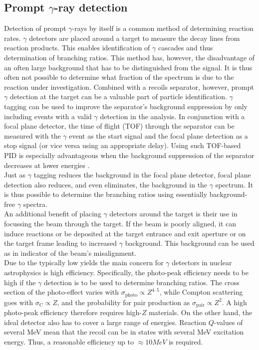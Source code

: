 \subsection{Prompt $\gamma$-ray detection}

Detection of prompt $\gamma$-rays by itself is a common method of determining reaction rates. $\gamma$ detectors are placed around a target to measure the decay lines from reaction products. This enables identification of $\gamma$ cascades and thus determination of branching ratios. This method has, however, the disadvantage of an often large background that has to be distinguished from the signal. It is thus often not possible to determine what fraction of the spectrum is due to the reaction under investigation. Combined with a recoils separator, however, prompt $\gamma$ detection at the target can be a valuable part of particle identification. $\gamma$ tagging can be used to improve the separator's background suppression by only including events with a valid $\gamma$ detection in the analysis. In conjunction with a focal plane detector, the time of flight (TOF) through the separator can be measured with the $\gamma$ event as the start signal and the focal plane detection as a stop signal (or vice versa using an appropriate delay). Using such TOF-based PID is especially advantageous when the background suppression of the separator decreases at lower energies \cite{hutc08}. \\
Just as $\gamma$ tagging reduces the background in the focal plane detector, focal plane detection also reduces, and even eliminates, the background in the $\gamma$ spectrum. It is thus possible to determine the branching ratios using essentially background-free $\gamma$ spectra.\\
An additional benefit of placing $\gamma$ detectors around the target is their use in focussing the beam through the target. If the beam is poorly aligned, it can induce reactions or be deposited at the target entrance and exit aperture or on the target frame leading to increased $\gamma$ background. This background can be used as in indicator of the beam's misalignment.\\  
Due to the typically low yields the main concern for $\gamma$ detectors in nuclear astrophysics is high efficiency. Specifically, the photo-peak efficiency needs to be high if the $\gamma$ detection is to be used to determine branching ratios. The cross section of the photo-effect varies with $\sigma_\mathrm{photo} \propto Z^{4\textrm{--}5}$, while Compton scattering goes with $\sigma_\mathrm{C} \propto Z$, and the probability for pair production as $\sigma_\mathrm{pair} \propto Z^2$. A high photo-peak efficiency therefore requires high-$Z$ materials. On the other hand, the ideal detector also has to cover a large range of energies. Reaction $Q$-values of several MeV mean that the recoil can be in states with several MeV excitation energy. Thus, a reasonable efficiency up to $\approx 10\unit{MeV}$ is required.\\
